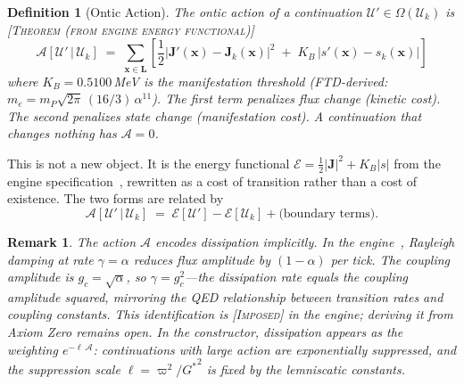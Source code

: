 \documentclass[11pt,a4paper]{article}
\newcommand{\vpi}{\varpi}
\newcommand{\KB}{K_B}
\newcommand{\UU}{\mathcal{U}}
\newcommand{\OO}{\Omega}
\newcommand{\onticell}{\ell}
\newcommand{\etag}[1]{{\normalfont\textsc{\footnotesize [#1]}}}
\theoremstyle{compact}
\newtheorem{definition}{Definition}
\newtheorem*{remark}{Remark}
\begin{document}
\begin{definition}[Ontic Action]
\label{def:action}
The \emph{ontic action} of a continuation $\UU' \in \OO(\UU_k)$ is \etag{Theorem (from engine energy functional)}
\[
\mathcal{A}[\UU' \,|\, \UU_k] \;=\; \sum_{\mathbf{x} \in \mathbf{L}} \left[\frac{1}{2}\bigl|\mathbf{J}'(\mathbf{x}) - \mathbf{J}_k(\mathbf{x})\bigr|^2 \;+\; \KB\,\bigl|s'(\mathbf{x}) - s_k(\mathbf{x})\bigr|\right]
\]
where $\KB = 0.5100$\,MeV is the manifestation threshold (FTD-derived: $m_e = m_P\sqrt{2\pi}\,(16/3)\,\alpha^{11}$). The first term penalizes flux change (kinetic cost). The second penalizes state change (manifestation cost). A continuation that changes nothing has $\mathcal{A} = 0$.
\end{definition}

This is not a new object. It is the energy functional $\mathcal{E} = \frac{1}{2}|\mathbf{J}|^2 + \KB|s|$ from the engine specification~\cite{lifecycle}, rewritten as a cost of transition rather than a cost of existence. The two forms are related by
\[
\mathcal{A}[\UU' \,|\, \UU_k] \;=\; \mathcal{E}[\UU'] - \mathcal{E}[\UU_k] + \text{(boundary terms)}.
\]

\begin{remark}
The action $\mathcal{A}$ encodes dissipation implicitly. In the engine~\cite{engine}, Rayleigh damping at rate $\gamma = \alpha$ reduces flux amplitude by $(1-\alpha)$ per tick. The coupling amplitude is $g_c = \sqrt{\alpha}$, so $\gamma = g_c^2$---the dissipation rate equals the coupling amplitude squared, mirroring the QED relationship between transition rates and coupling constants. This identification is \etag{Imposed} in the engine; deriving it from Axiom Zero remains open. In the constructor, dissipation appears as the weighting $e^{-\onticell\,\mathcal{A}}$: continuations with large action are exponentially suppressed, and the suppression scale $\onticell = \vpi^2/{G^*}^2$ is fixed by the lemniscatic constants.
\end{remark}
\end{document}
